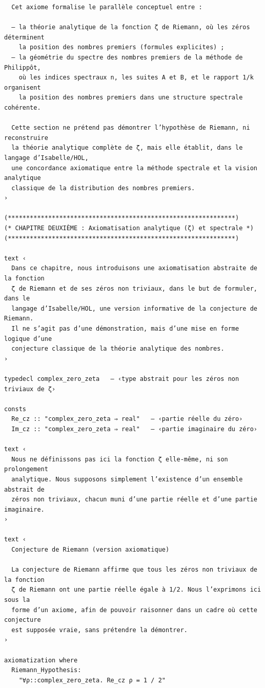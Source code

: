 \documentclass[a4paper,11pt]{article}
\begin{document}
\begin{holcode}[title={\textcolor{white}{Fichier : methode\_spectral.thy -- Partie 1/4}}]
\begin{lstlisting}
  Cet axiome formalise le parallèle conceptuel entre :

  – la théorie analytique de la fonction ζ de Riemann, où les zéros déterminent
    la position des nombres premiers (formules explicites) ;
  – la géométrie du spectre des nombres premiers de la méthode de Philippôt,
    où les indices spectraux n, les suites A et B, et le rapport 1/k organisent
    la position des nombres premiers dans une structure spectrale cohérente.

  Cette section ne prétend pas démontrer l’hypothèse de Riemann, ni reconstruire
  la théorie analytique complète de ζ, mais elle établit, dans le langage d’Isabelle/HOL,
  une concordance axiomatique entre la méthode spectrale et la vision analytique
  classique de la distribution des nombres premiers.
›

(**************************************************************)
(* CHAPITRE DEUXIÈME : Axiomatisation analytique (ζ) et spectrale *)
(**************************************************************)

text ‹
  Dans ce chapitre, nous introduisons une axiomatisation abstraite de la fonction
  ζ de Riemann et de ses zéros non triviaux, dans le but de formuler, dans le
  langage d’Isabelle/HOL, une version informative de la conjecture de Riemann.
  Il ne s’agit pas d’une démonstration, mais d’une mise en forme logique d’une
  conjecture classique de la théorie analytique des nombres.
›

typedecl complex_zero_zeta   ― ‹type abstrait pour les zéros non triviaux de ζ›

consts
  Re_cz :: "complex_zero_zeta ⇒ real"   ― ‹partie réelle du zéro›
  Im_cz :: "complex_zero_zeta ⇒ real"   ― ‹partie imaginaire du zéro›

text ‹
  Nous ne définissons pas ici la fonction ζ elle-même, ni son prolongement
  analytique. Nous supposons simplement l’existence d’un ensemble abstrait de
  zéros non triviaux, chacun muni d’une partie réelle et d’une partie imaginaire.
›

text ‹
  Conjecture de Riemann (version axiomatique)

  La conjecture de Riemann affirme que tous les zéros non triviaux de la fonction
  ζ de Riemann ont une partie réelle égale à 1/2. Nous l’exprimons ici sous la
  forme d’un axiome, afin de pouvoir raisonner dans un cadre où cette conjecture
  est supposée vraie, sans prétendre la démontrer.
›

axiomatization where
  Riemann_Hypothesis:
    "∀ρ::complex_zero_zeta. Re_cz ρ = 1 / 2"


\end{lstlisting}
\end{holcode}
\end{document}
